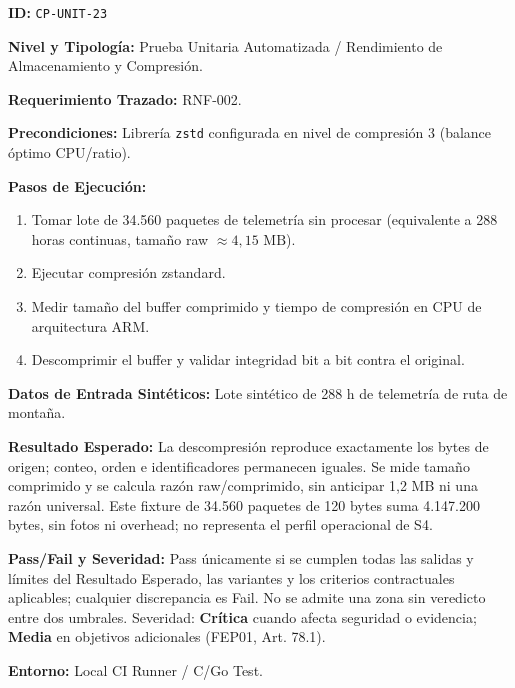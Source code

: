 \par\noindent\textbf{ID:} \texttt{C\allowbreak{}P\allowbreak{}-\allowbreak{}U\allowbreak{}N\allowbreak{}I\allowbreak{}T\allowbreak{}-\allowbreak{}2\allowbreak{}3\allowbreak{}}\par
\par\noindent\textbf{Nivel y Tipología:} Prueba Unitaria Automatizada / Rendimiento de Almacenamiento y Compresión.\par
\par\noindent\textbf{Requerimiento Trazado:} RNF-002.\par
\par\noindent\textbf{Precondiciones:} Librería \texttt{z\allowbreak{}s\allowbreak{}t\allowbreak{}d\allowbreak{}} configurada en nivel de compresión 3 (balance óptimo CPU/ratio).\par
\par\noindent\textbf{Pasos de Ejecución:} \par
\begin{enumerate}
\item Tomar lote de 34.560 paquetes de telemetría sin procesar (equivalente a 288 horas continuas, tamaño raw \(\approx 4{,}15\text{ MB}\)).
\item Ejecutar compresión zstandard.
\item Medir tamaño del buffer comprimido y tiempo de compresión en CPU de arquitectura ARM.
\item Descomprimir el buffer y validar integridad bit a bit contra el original.
\end{enumerate}
\par\noindent\textbf{Datos de Entrada Sintéticos:} Lote sintético de 288 h de telemetría de ruta de montaña.\par
\par\noindent\textbf{Resultado Esperado:} La descompresión reproduce exactamente los bytes de origen; conteo, orden e identificadores permanecen iguales. Se mide tamaño comprimido y se calcula razón raw/comprimido, sin anticipar 1,2 MB ni una razón universal. Este fixture de 34.560 paquetes de 120 bytes suma 4.147.200 bytes, sin fotos ni overhead; no representa el perfil operacional de S4.\par
\par\noindent\textbf{Pass/Fail y Severidad:} Pass únicamente si se cumplen todas las salidas y límites del Resultado Esperado, las variantes y los criterios contractuales aplicables; cualquier discrepancia es Fail. No se admite una zona sin veredicto entre dos umbrales. Severidad: \textbf{Crítica} cuando afecta seguridad o evidencia; \textbf{Media} en objetivos adicionales (FEP01, Art. 78.1).\par
\par\noindent\textbf{Entorno:} Local CI Runner / C/Go Test.\par







